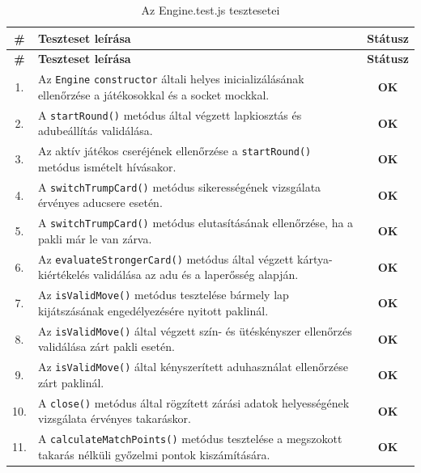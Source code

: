 \vspace{1em}
\begin{longtable}{| c | m{11.5cm} | c |}
    \caption{Az Engine.test.js tesztesetei}
    \label{tab:test_engine} \\
    \hline
    \textbf{\#} & \textbf{Teszteset leírása} & \textbf{Státusz} \\
    \hline
    \endfirsthead
    \hline
    \textbf{\#} & \textbf{Teszteset leírása} & \textbf{Státusz} \\
    \hline
    \endhead
    \hline
    \endlastfoot

    1. & Az \texttt{Engine} \texttt{constructor} általi helyes inicializálásának ellenőrzése a játékosokkal és a socket mockkal. & \cellcolor{green!40}\textbf{OK} \\ \hline
    2. & A \texttt{startRound()} metódus által végzett lapkiosztás és adubeállítás validálása. & \cellcolor{green!40}\textbf{OK} \\ \hline
    3. & Az aktív játékos cseréjének ellenőrzése a \texttt{startRound()} metódus ismételt hívásakor. & \cellcolor{green!40}\textbf{OK} \\ \hline
    4. & A \texttt{switchTrumpCard()} metódus sikerességének vizsgálata érvényes aducsere esetén. & \cellcolor{green!40}\textbf{OK} \\ \hline
    5. & A \texttt{switchTrumpCard()} metódus elutasításának ellenőrzése, ha a pakli már le van zárva. & \cellcolor{green!40}\textbf{OK} \\ \hline
    6. & Az \texttt{evaluateStrongerCard()} metódus által végzett kártya-kiértékelés validálása az adu és a laperősség alapján. & \cellcolor{green!40}\textbf{OK} \\ \hline
    7. & Az \texttt{isValidMove()} metódus tesztelése bármely lap kijátszásának engedélyezésére nyitott paklinál. & \cellcolor{green!40}\textbf{OK} \\ \hline
    8. & Az \texttt{isValidMove()} által végzett szín- és ütéskényszer ellenőrzés validálása zárt pakli esetén. & \cellcolor{green!40}\textbf{OK} \\ \hline
    9. & Az \texttt{isValidMove()} által kényszerített aduhasználat ellenőrzése zárt paklinál. & \cellcolor{green!40}\textbf{OK} \\ \hline
    10. & A \texttt{close()} metódus által rögzített zárási adatok helyességének vizsgálata érvényes takaráskor. & \cellcolor{green!40}\textbf{OK} \\ \hline
    11. & A \texttt{calculateMatchPoints()} metódus tesztelése a megszokott takarás nélküli győzelmi pontok kiszámítására. & \cellcolor{green!40}\textbf{OK} \\ \hline

\end{longtable}
